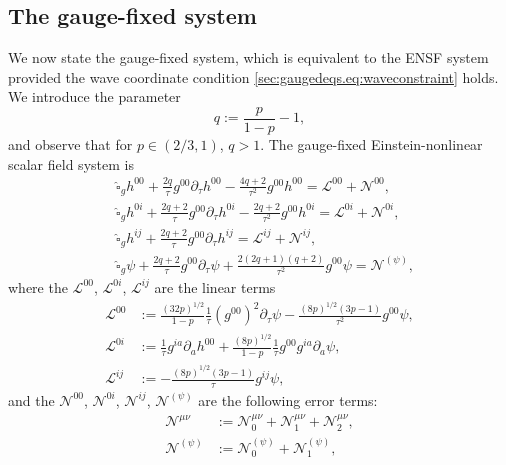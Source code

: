 \documentclass{article}
\newcommand{\mc}{\mathcal}
\newcommand{\wh}{\widehat}
\newcommand{\pa}{\partial}
\begin{document}
\subsection{The gauge-fixed system}
We now state the gauge-fixed system, which is equivalent to the ENSF system provided the wave coordinate condition \eqref{sec:gaugedeqs.eq:waveconstraint} holds. We introduce the parameter
\begin{equation}
    q := \frac{p}{1-p}-1,
\end{equation}
and observe that for $p \in (2/3,1)$, $q > 1$.
The gauge-fixed Einstein-nonlinear scalar field system is
\begin{subequations}\label{sec:gaugedeqs.eq:wave}
    \begin{align}
        &\wh{\square}_gh^{00} + \frac{2q}{\tau}g^{00}\pa_\tau h^{00} - \frac{4q+2}{\tau^2}g^{00}h^{00} = \mc{L}^{00} + \mc{N}^{00},\label{sec:gaugedeqs.eq:wavelapse}\\
        &\wh{\square}_g h^{0i} + \frac{2q+2}{\tau}g^{00}\pa_\tau h^{0i} - \frac{2q+2}{\tau^2}g^{00}h^{0i} = \mc{L}^{0i} + \mc{N}^{0i},\label{sec:gaugedeqs.eq:waveshift}\\
        &\wh{\square}_g h^{ij} + \frac{2q+2}{\tau} g^{00}\pa_\tau h^{ij} = \mc{L}^{ij} + \mc{N}^{ij},\label{sec:gaugedeqs.eq:wavehori}\\
        &\wh{\square}_g \psi + \frac{2q+2}{\tau} g^{00}\pa_\tau \psi + \frac{2(2q+1)(q+2)}{\tau^2}g^{00}\psi = \mc{N}^{(\psi)},\label{sec:gaugedeqs.eq:wavescalar}
    \end{align}
\end{subequations}
where the $\mc{L}^{00}$, $\mc{L}^{0i}$, $\mc{L}^{ij}$ are the linear terms
\begin{subequations}
    \begin{align}
        \mc{L}^{00} &:= \frac{(32p)^{1/2}}{1-p}\frac{1}{\tau} (g^{00})^2\pa_\tau \psi - \frac{(8p)^{1/2}(3p-1)}{\tau^2}g^{00}\psi,\\
        \mc{L}^{0i} &:= \frac{1}{\tau}g^{i a}\pa_a h^{00} + \frac{(8p)^{1/2}}{1-p}\frac{1}{\tau}g^{00}g^{ia}\pa_a \psi,\\
        \mc{L}^{ij} &:= -\frac{(8p)^{1/2}(3p-1)}{\tau}g^{ij}\psi,
    \end{align}
\end{subequations}
and the $\mc{N}^{00}$, $\mc{N}^{0i}$, $\mc{N}^{ij}$, $\mc{N}^{(\psi)}$ are the following error terms:
\begin{subequations}
    \begin{align}
        \mc{N}^{\mu\nu} &:= \mc{N}_0^{\mu\nu} + \mc{N}_1^{\mu\nu} + \mc{N}_2^{\mu\nu},\\
        \mc{N}^{(\psi)} &:=\mc{N}_0^{(\psi)} + \mc{N}_1^{(\psi)},
    \end{align}
\end{subequations}
\end{document}
